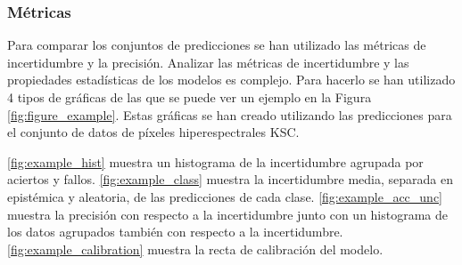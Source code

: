 \subsubsection{Métricas}

Para comparar los conjuntos de predicciones se han utilizado las métricas de incertidumbre y la precisión. Analizar las métricas de incertidumbre y las propiedades estadísticas de los modelos es complejo. Para hacerlo se han utilizado 4 tipos de gráficas de las que se puede ver un ejemplo en la Figura \ref{fig:figure_example}. Estas gráficas se han creado utilizando las predicciones para el conjunto de datos de píxeles hiperespectrales KSC.

\ref{fig:example_hist} muestra un histograma de la incertidumbre agrupada por aciertos y fallos. \ref{fig:example_class} muestra la incertidumbre media, separada en epistémica y aleatoria, de las predicciones de cada clase. \ref{fig:example_acc_unc} muestra la precisión con respecto a la incertidumbre junto con un histograma de los datos agrupados también con respecto a la incertidumbre. \ref{fig:example_calibration} muestra la recta de calibración del modelo.

